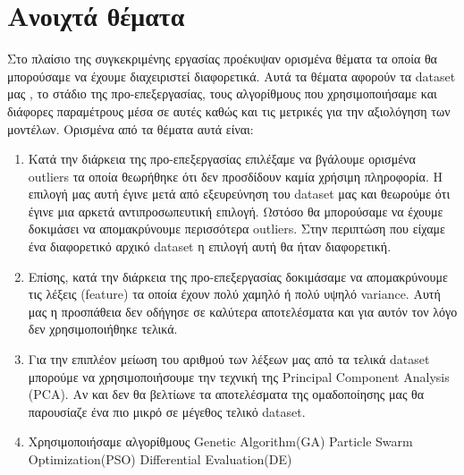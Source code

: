 \chapter{Ανοιχτά θέματα}
Στο πλαίσιο της συγκεκριμένης εργασίας προέκυψαν ορισμένα θέματα τα οποία θα μπορούσαμε να έχουμε διαχειριστεί διαφορετικά. Αυτά τα θέματα αφορούν τα dataset μας , το στάδιο της προ-επεξεργασίας, τους αλγορίθμους που χρησιμοποιήσαμε και διάφορες παραμέτρους μέσα σε αυτές καθώς και τις μετρικές για την αξιολόγηση των μοντέλων. Ορισμένα από τα θέματα αυτά είναι:

\begin{enumerate}
	\item Κατά την διάρκεια της προ-επεξεργασίας επιλέξαμε να βγάλουμε ορισμένα outliers τα οποία θεωρήθηκε ότι δεν προσδίδουν καμία χρήσιμη πληροφορία. Η επιλογή μας αυτή έγινε μετά από εξευρεύνηση του dataset μας και θεωρούμε ότι έγινε μια αρκετά αντιπροσωπευτική επιλογή. Ωστόσο θα μπορούσαμε να έχουμε δοκιμάσει να απομακρύνουμε περισσότερα outliers. Στην περιπτώση που είχαμε ένα διαφορετικό αρχικό dataset η επιλογή αυτή θα ήταν διαφορετική.
	\item Επίσης, κατά την διάρκεια της προ-επεξεργασίας δοκιμάσαμε να απομακρύνουμε τις λέξεις (feature) τα οποία έχουν πολύ χαμηλό ή πολύ υψηλό variance. Αυτή μας η προσπάθεια δεν οδήγησε σε καλύτερα αποτελέσματα και για αυτόν τον λόγο δεν χρησιμοποιήθηκε τελικά.
	\item Για την επιπλέον μείωση του αριθμού των λέξεων μας από τα τελικά dataset μπορούμε να χρησιμοποιήσουμε την τεχνική της Principal Component Analysis (PCA). Αν και δεν θα βελτίωνε τα αποτελέσματα της ομαδοποίησης μας θα παρουσίαζε ένα πιο μικρό σε μέγεθος τελικό dataset.
	\item Χρησιμοποιήσαμε αλγορίθμους 
		Genetic Algorithm(GA)
		Particle Swarm Optimization(PSO)
		Differential Evaluation(DE)
\end{enumerate}